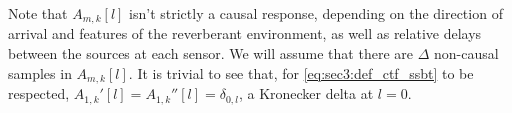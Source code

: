 Note that $A_{m,k}[l]$ isn't strictly a causal response, depending on the direction of arrival and features of the reverberant environment, as well as relative delays between the sources at each sensor. We will assume that there are $\Delta$ non-causal samples in $A_{m,k}[l]$. It is trivial to see that, for \cref{eq:sec3:def_ctf_ssbt} to be respected, $A_{1,k}'[l] = A_{1,k}''[l] = \delta_{0,l}$, a Kronecker delta at $l=0$.

%	
